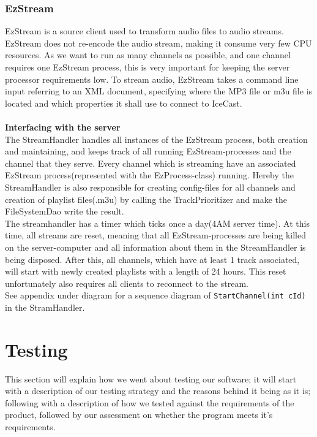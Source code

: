 \documentclass[a4paper,11pt,report]{article}
\begin{document}
{\subsubsection{EzStream}
EzStream\cite{EzStream} is a source client used to transform audio files to audio streams. EzStream does not re-encode the audio stream, making it consume very few CPU resources. As we want to run as many channels as possible, and one channel requires one EzStream process, this is very important for keeping the server processor requirements low. To stream audio, EzStream takes a command line input referring to an XML document, specifying where the MP3 file or m3u file is located and which properties it shall use to connect to IceCast. \\ \\
\textbf{Interfacing with the server} \\
The StreamHandler handles all instances of the EzStream process, both creation and maintaining, and keeps track of all running EzStream-processes and the channel that they serve. Every channel which is streaming have an associated EzStream process(represented with the EzProcess-class) running. Hereby the StreamHandler is also responsible for creating config-files for all channels and creation of playlist files(.m3u) by calling the TrackPrioritizer and make the FileSystemDao write the result. \\

The streamhandler has a timer which ticks once a day(4AM server time). At this time, all streams are reset, meaning that all EzStream-processes are being killed on the server-computer and all information about them in the StreamHandler is being disposed. After this, all channels, which have at least 1 track associated, will start with newly created playlists with a length of 24 hours. This reset unfortunately also requires all clients to reconnect to the stream. \\

See appendix under diagram for a sequence diagram of \texttt{StartChannel(int cId)} in the StramHandler.


\section{Testing}
This section will explain how we went about testing our software; it will start with a description of our testing strategy and the reasons behind it being
as it is; following with a description of how we tested against the requirements of the product, followed by our assessment on whether the program meets it's requirements.

}
\end{document}
